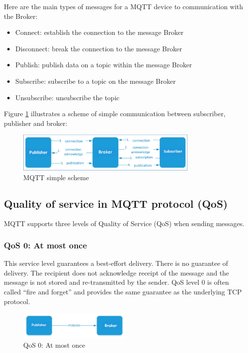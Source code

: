 \documentclass[\main/main.tex]{subfiles}
\begin{document}
Here are the main types of messages for a MQTT device to communication with the Broker:

\begin{itemize}
    \item Connect: establish the connection to the message Broker
    \item Disconnect: break the connection to the message Broker
    \item Publish: publish data on a topic within the message Broker
    \item Subscribe: subscribe to a topic on the message Broker
    \item Unsubscribe: unsubscribe the topic
\end{itemize}


Figure \ref{fig:mqtt_schema} illustrates a scheme of simple communication between subscriber, publisher and broker: 
\begin{figure}[H]
    \begin{center}
        \includegraphics[width=0.8\textwidth]{mqtt_schema.jpg}
    \end{center}
    \caption{MQTT simple scheme}
    \label{fig:mqtt_schema}
\end{figure}

\subsection{Quality of service in MQTT protocol (QoS)}

MQTT supports three levels of Quality of Service (QoS) when sending messages.

\subsubsection{QoS 0: At most once}
This service level guarantees a best-effort delivery. There is no guarantee of delivery. The recipient does not acknowledge receipt of the message and the message is not stored and re-transmitted by the sender. QoS level 0 is often called “fire and forget” and provides the same guarantee as the underlying TCP protocol.
\begin{figure}[H]
    \begin{center}
        \includegraphics[width=0.5\textwidth]{mqtt_qos_0.jpg}
    \end{center}
    \caption{QoS 0: At most once}
    \label{fig:mqtt_qos_0}
\end{figure}
\end{document}
